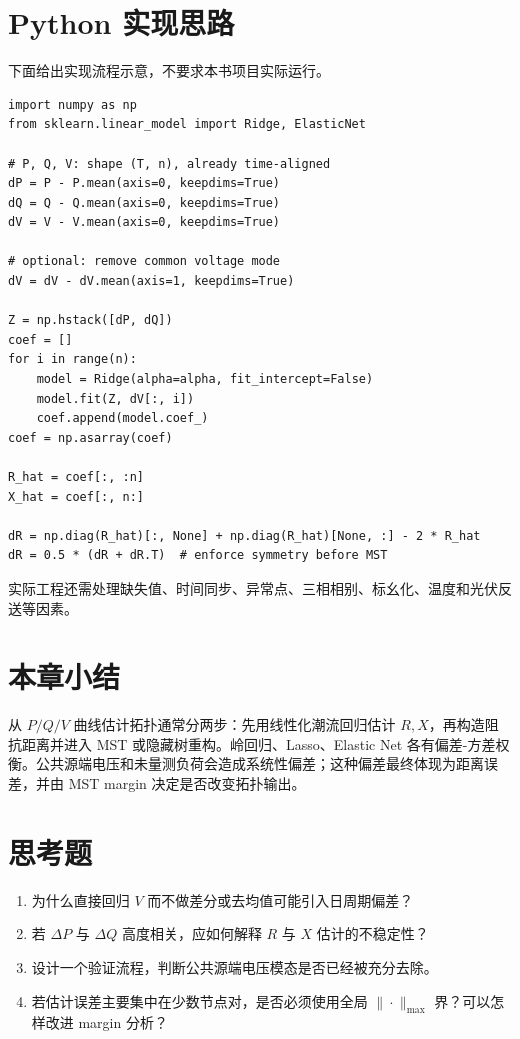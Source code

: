 \section{Python 实现思路}

下面给出实现流程示意，不要求本书项目实际运行。

\begin{verbatim}
import numpy as np
from sklearn.linear_model import Ridge, ElasticNet

# P, Q, V: shape (T, n), already time-aligned
dP = P - P.mean(axis=0, keepdims=True)
dQ = Q - Q.mean(axis=0, keepdims=True)
dV = V - V.mean(axis=0, keepdims=True)

# optional: remove common voltage mode
dV = dV - dV.mean(axis=1, keepdims=True)

Z = np.hstack([dP, dQ])
coef = []
for i in range(n):
    model = Ridge(alpha=alpha, fit_intercept=False)
    model.fit(Z, dV[:, i])
    coef.append(model.coef_)
coef = np.asarray(coef)

R_hat = coef[:, :n]
X_hat = coef[:, n:]

dR = np.diag(R_hat)[:, None] + np.diag(R_hat)[None, :] - 2 * R_hat
dR = 0.5 * (dR + dR.T)  # enforce symmetry before MST
\end{verbatim}

实际工程还需处理缺失值、时间同步、异常点、三相相别、标幺化、温度和光伏反送等因素。

\section{本章小结}

从 $P/Q/V$ 曲线估计拓扑通常分两步：先用线性化潮流回归估计 $R,X$，再构造阻抗距离并进入 MST 或隐藏树重构。岭回归、Lasso、Elastic Net 各有偏差-方差权衡。公共源端电压和未量测负荷会造成系统性偏差；这种偏差最终体现为距离误差，并由 MST margin 决定是否改变拓扑输出。

\section*{思考题}
\begin{enumerate}
  \item 为什么直接回归 $V$ 而不做差分或去均值可能引入日周期偏差？
  \item 若 $\Delta P$ 与 $\Delta Q$ 高度相关，应如何解释 $R$ 与 $X$ 估计的不稳定性？
  \item 设计一个验证流程，判断公共源端电压模态是否已经被充分去除。
  \item 若估计误差主要集中在少数节点对，是否必须使用全局 $\|\cdot\|_{\max}$ 界？可以怎样改进 margin 分析？
\end{enumerate}
